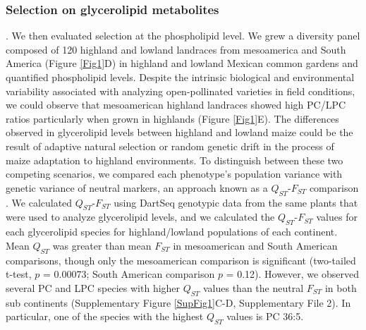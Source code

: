 \documentclass[9pt,twocolumn,twoside,lineno]{BioRxiv}
\begin{document}
\subsubsection{Selection on glycerolipid metabolites}.  
We then evaluated selection at the phospholipid level. We grew a diversity panel composed of 120 highland and lowland landraces from mesoamerica and South America (Figure \ref{Fig1}D) in highland and lowland Mexican common gardens and quantified phospholipid levels.    
Despite the intrinsic biological and environmental variability associated with analyzing open-pollinated varieties in field conditions, we could observe that mesoamerican highland landraces showed  high PC/LPC ratios  particularly when grown in highlands (Figure \ref{Fig1}E). 
The differences observed in glycerolipid levels between highland and lowland maize could be the result of adaptive natural selection or random genetic drift in the process of maize adaptation to highland environments.
To distinguish between these two competing scenarios, we compared each phenotype's population variance with genetic variance of neutral markers, an approach known as a $Q_{ST}$-$F_{ST}$ comparison \cite{Leinonen2013-ic}.
We calculated $Q_{ST}$-$F_{ST}$ using DartSeq genotypic data from the same plants that were used to analyze glycerolipid levels, and we calculated the $Q_{ST}$-$F_{ST}$ values for each glycerolipid species for highland/lowland populations of each continent. 
Mean $Q_{ST}$ was greater than mean $F_{ST}$ in mesoamerican and South American comparisons, though only the mesoamerican comparison is significant (two-tailed t-test, $p$ = 0.00073; South American comparison $p$ = 0.12).
However, we observed several PC and LPC species with higher $Q_{ST}$ values than the neutral $F_{ST}$ in both sub continents (Supplementary Figure \ref{SupFig1}C-D, Supplementary File 2).
In particular, one of the species with the highest $Q_{ST}$ values is PC 36:5. 
\end{document}

